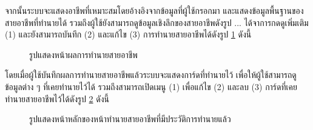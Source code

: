 จากนั้นระบบจะแสดงอาชีพที่เหมาะสมโดยอ้างอิงจากข้อมูลที่ผู้ใช้กรอกมา และแสดงข้อมูลพื้นฐานของสายอาชีพที่ทำนายได้ รวมถึงผู้ใช้ยังสามารถดูข้อมูลเชิงลึกของสายอาชีพดังรูป ... ได้จาการกดดูเพิ่มเติม (1) และยังสามารถบันทึก (2) และแก้ไข (3) การทำนายสายอาชีพได้ดังรูป \ref{fig:viewmore-CP} ดังนี้
\begin{figure}[H]\centering
    \caption{รูปแสดงหน้าผลการทำนายสายอาชีพ}\label{fig:viewmore-CP}
\end{figure}
โดยเมื่อผู้ใช้บันทึกผลการทำนายสายอาชีพแล้วระบบจะแสดงการ์ดที่ทำนายไว้ เพื่อให้ผู้ใช้สามารถดูข้อมูลต่าง ๆ ที่เคยทำนายไว้ได้ รวมถึงสามารถเปิดเมนู (1) เพื่อแก้ไข (2) และลบ (3) การ์ดที่เคยทำนายสายอาชีพไว้ได้ดังรูป \ref{fig:cardhistory-CP} ดังนี้
\begin{figure}[H]\centering
    \caption{รูปแสดงหน้าหลักของหน้าทำนายสายอาชีพที่มีประวัติการทำนายแล้ว}\label{fig:cardhistory-CP}
\end{figure}
